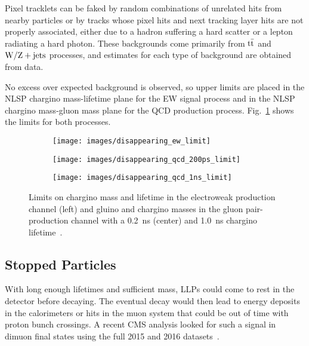 \documentclass[12pt]{article}
\begin{document}
        Pixel tracklets can be faked by random combinations of unrelated hits from nearby particles or by tracks whose pixel hits and next tracking layer hits are not properly associated, either due to a hadron suffering a hard scatter or a lepton radiating a hard photon. These backgrounds come primarily from $\mathrm{t}\bar{\mathrm{t}}$ and $\mathrm{W}/\mathrm{Z} + \mathrm{jets}$ processes, and estimates for each type of background are obtained from data.

        No excess over expected background is observed, so upper limits are placed in the NLSP chargino mass-lifetime plane for the EW signal process and in the NLSP chargino mass-gluon mass plane for the QCD production process. Fig.~\ref{disappearing_limits} shows the limits for both processes.

        \noindent \begin{figure}[htbp] \begin{center}
        \begin{subfigure}[htbp]{0.32\textwidth} \begin{center}
        \texttt{[image: images/disappearing\_ew\_limit]}
        \end{center} \end{subfigure}
        \begin{subfigure}[htbp]{0.32\textwidth} \begin{center}
        \texttt{[image: images/disappearing\_qcd\_200ps\_limit]}
        \end{center} \end{subfigure}
        \begin{subfigure}[htbp]{0.32\textwidth} \begin{center}
        \texttt{[image: images/disappearing\_qcd\_1ns\_limit]}
        \end{center} \end{subfigure}
        \caption{Limits on chargino mass and lifetime in the electroweak production channel (left) and gluino and chargino masses in the gluon pair-production channel with a \SI{0.2}{\nano\s} (center) and \SI{1.0}{\nano\s} chargino lifetime~\cite{atlas_disappearing}.}
        \label{disappearing_limits}
        \end{center} \end{figure}

    \subsection{Stopped Particles}
        With long enough lifetimes and sufficient mass, LLPs could come to rest in the detector before decaying. The eventual decay would then lead to energy deposits in the calorimeters or hits in the muon system that could be out of time with proton bunch crossings. A recent CMS analysis looked for such a signal in dimuon final states using the full 2015 and 2016 datasets~\cite{cms_stopped}. 
\end{document}
